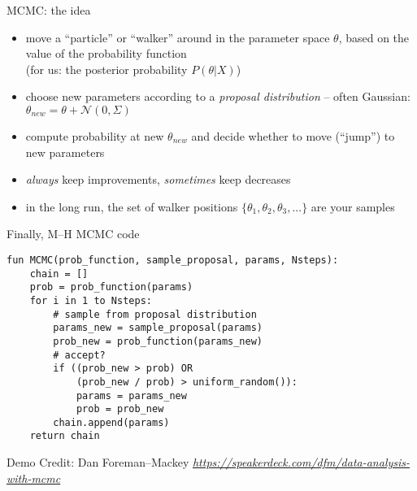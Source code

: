 \documentclass[compress,t]{beamer}
\newcommand{\niceurl}[1]{\mbox{\href{#1}{\textsl{#1}}}}
\begin{document}
\begin{frame}{MCMC: the idea}
  \begin{itemize}
  \item move a ``particle'' or ``walker'' around in the parameter space $\theta$, based on the value of the
    probability function \\ (for us: the posterior probability $P(\theta | X)$)
  \item choose new parameters according to a \emph{proposal distribution}
    -- often Gaussian: $\theta_{new} = \theta + \mathcal{N}(0, \Sigma)$
  \item compute probability at new $\theta_{new}$ and decide whether to move (``jump'') to new parameters
  \item \emph{always} keep improvements, \emph{sometimes} keep decreases
  \item in the long run, the set of walker positions $\{ \theta_1, \theta_2, \theta_3, ... \}$ are your samples
  \end{itemize}
\end{frame}

\begin{frame}[fragile]{Finally, M--H MCMC code}
\begin{verbatim}
fun MCMC(prob_function, sample_proposal, params, Nsteps):
    chain = []
    prob = prob_function(params)
    for i in 1 to Nsteps:
        # sample from proposal distribution
        params_new = sample_proposal(params)
        prob_new = prob_function(params_new)
        # accept?
        if ((prob_new > prob) OR
            (prob_new / prob) > uniform_random()):
            params = params_new
            prob = prob_new
        chain.append(params)
    return chain
\end{verbatim}
\end{frame}

\begin{frame}{Demo}
  Credit: Dan Foreman--Mackey
  \niceurl{https://speakerdeck.com/dfm/data-analysis-with-mcmc}
\end{frame}

{

}
\end{document}
